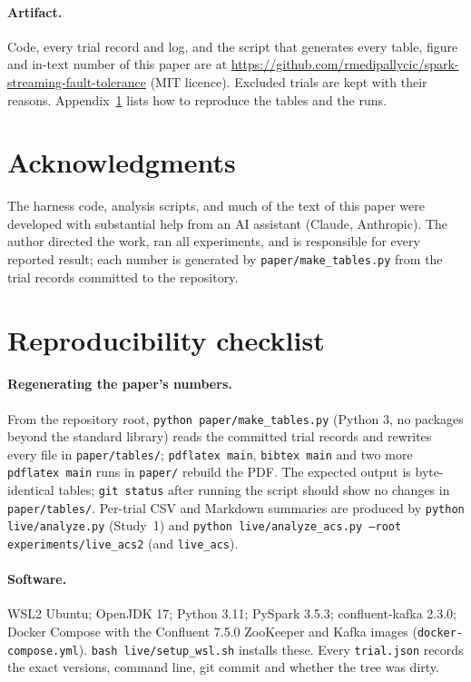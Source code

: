 \documentclass[10pt,twocolumn]{article}
\begin{document}
\paragraph{Artifact.}
Code, every trial record and log, and the script that generates every table,
figure and in-text number of this paper are at
\url{https://github.com/rmedipallycic/spark-streaming-fault-tolerance}
(MIT licence). Excluded trials are kept with their reasons.
Appendix~\ref{app:repro} lists how to reproduce the tables and the runs.

\section*{Acknowledgments}
The harness code, analysis scripts, and much of the text of this paper were
developed with substantial help from an AI assistant (Claude, Anthropic). The
author directed the work, ran all experiments, and is responsible for every
reported result; each number is generated by \texttt{paper/make\_tables.py}
from the trial records committed to the repository.

\appendix
\section{Reproducibility checklist}
\label{app:repro}

\paragraph{Regenerating the paper's numbers.}
From the repository root, \texttt{python paper/make\_tables.py} (Python 3, no
packages beyond the standard library) reads the committed trial records and
rewrites every file in \texttt{paper/tables/}; \texttt{pdflatex main},
\texttt{bibtex main} and two more \texttt{pdflatex main} runs in
\texttt{paper/} rebuild the PDF. The expected output is byte-identical tables;
\texttt{git status} after running the script should show no changes in
\texttt{paper/tables/}. Per-trial CSV and Markdown summaries are produced by
\texttt{python live/analyze.py} (Study~1) and
\texttt{python live/analyze\_acs.py --root experiments/live\_acs2} (and
\texttt{live\_acs}).

\paragraph{Software.}
WSL2 Ubuntu; OpenJDK 17; Python 3.11; PySpark 3.5.3; confluent-kafka 2.3.0;
Docker Compose with the Confluent 7.5.0 ZooKeeper and Kafka images
(\texttt{docker-compose.yml}). \texttt{bash live/setup\_wsl.sh} installs these.
Every \texttt{trial.json} records the exact versions, command line, git commit
and whether the tree was dirty.
\end{document}

